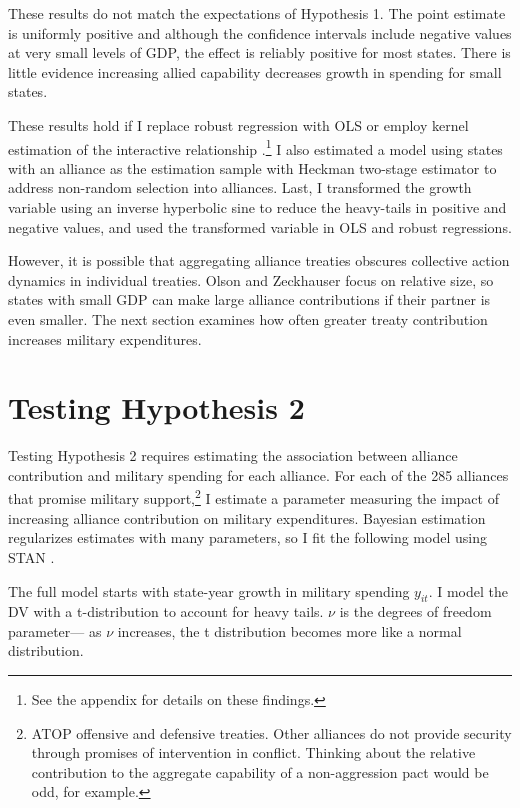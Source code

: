 \documentclass[12pt]{article}
\begin{document}
These results do not match the expectations of Hypothesis 1. 
The point estimate is uniformly positive and although the confidence intervals include negative values at very small levels of GDP, the effect is reliably positive for most states. 
There is little evidence increasing allied capability decreases growth in spending for small states. 


These results hold if I replace robust regression with OLS or employ kernel estimation of the interactive relationship \citep{Hainmuelleretal2019}.\footnote{See the appendix for details on these findings.} 
I also estimated a model using states with an alliance as the estimation sample with Heckman two-stage estimator to address non-random selection into alliances. 
Last, I transformed the growth variable using an inverse hyperbolic sine to reduce the heavy-tails in positive and negative values, and used the transformed variable in OLS and robust regressions. 


However, it is possible that aggregating alliance treaties obscures collective action dynamics in individual treaties. 
Olson and Zeckhauser focus on relative size, so states with small GDP can make large alliance contributions if their partner is even smaller. 
The next section examines how often greater treaty contribution increases military expenditures. 


\section{Testing Hypothesis 2}


Testing Hypothesis 2 requires estimating the association between alliance contribution and military spending for each alliance.
For each of the 285 alliances that promise military support,\footnote{ATOP offensive and defensive treaties. Other alliances do not provide security through promises of intervention in conflict. Thinking about the relative contribution to the aggregate capability of a non-aggression pact would be odd, for example.} I estimate a parameter measuring the impact of increasing alliance contribution on military expenditures. 
Bayesian estimation regularizes estimates with many parameters, so I fit the following model using STAN \citep{Carpenteretal2016}.


The full model starts with state-year growth in military spending $y_{it}$.
I model the DV with a t-distribution to account for heavy tails.
$\nu$ is the degrees of freedom parameter--- as $\nu$ increases, the t distribution becomes more like a normal distribution. 
\end{document}
